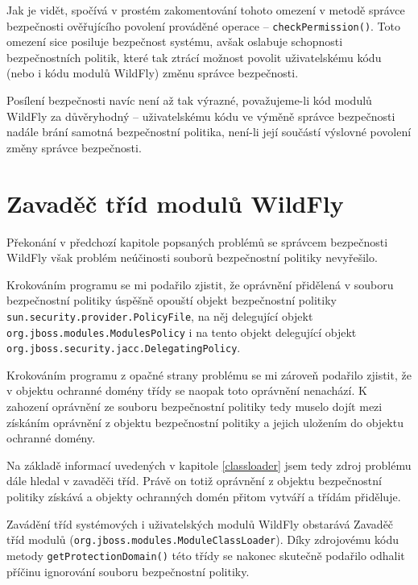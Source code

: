 Jak je vidět, spočívá v prostém zakomentování tohoto omezení v metodě správce bezpečnosti ověřujícího povolení prováděné operace -- {\tt checkPermission()}. Toto omezení sice posiluje bezpečnost systému, avšak oslabuje schopnosti bezpečnostních politik, které tak ztrácí možnost povolit uživatelskému kódu (nebo i kódu modulů WildFly) změnu správce bezpečnosti.

Posílení bezpečnosti navíc není až tak výrazné, považujeme-li kód modulů WildFly za důvěryhodný -- uživatelskému kódu ve výměně správce bezpečnosti nadále brání samotná bezpečnostní politika, není-li její součástí výslovné povolení změny správce bezpečnosti.

\section{Zavaděč tříd modulů WildFly}

Překonání v předchozí kapitole popsaných problémů se správcem bezpečnosti WildFly však problém neúčinosti souborů bezpečnostní politiky nevyřešilo.

Krokováním programu se mi podařilo zjistit, že oprávnění přidělená v souboru bezpečnostní politiky úspěšně opouští objekt bezpečnostní politiky {\tt sun.security.provider.PolicyFile}, na něj delegující objekt {\tt org.jboss.modules.ModulesPolicy} i na tento objekt delegující objekt {\tt org.jboss.security.jacc.DelegatingPolicy}.

Krokováním programu z opačné strany problému se mi zároveň podařilo zjistit, že v objektu ochranné domény třídy se naopak toto oprávnění nenachází. K zahození oprávnění ze souboru bezpečnostní politiky tedy muselo dojít mezi získáním oprávnění z objektu bezpečnostní politiky a jejich uložením do objektu ochranné domény.

Na základě informací uvedených v kapitole \ref{classloader} jsem tedy zdroj problému dále hledal v zavaděči tříd. Právě on totiž oprávnění z objektu bezpečnostní politiky získává a objekty ochranných domén přitom vytváří a třídám přiděluje.

Zavádění tříd systémových i uživatelských modulů WildFly obstarává Zavaděč tříd modulů ({\tt org.jboss.modules.ModuleClassLoader}). Díky zdrojovému kódu metody {\tt getProtectionDomain()} této třídy se nakonec skutečně podařilo odhalit příčinu ignorování souboru bezpečnostní politiky.

